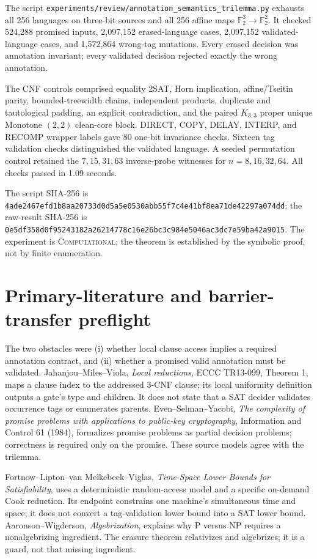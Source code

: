 \documentclass[11pt]{article}
\newcommand{\status}[1]{\textsc{#1}}
\begin{document}
The script
\texttt{experiments/review/annotation\_semantics\_trilemma.py} exhausts all
256 languages on three-bit sources and all 256 affine maps
$\mathbb F_2^3\to\mathbb F_2^2$.  It checked 524,288 promised inputs,
2,097,152 erased-language cases, 2,097,152 validated-language cases, and
1,572,864 wrong-tag mutations.  Every erased decision was annotation
invariant; every validated decision rejected exactly the wrong annotation.

The CNF controls comprised equality 2SAT, Horn implication, affine/Tseitin
parity, bounded-treewidth chains, independent products, duplicate and
tautological padding, an explicit contradiction, and the paired $K_{3,3}$
proper unique Monotone $(2,2)$ clean-core block.  DIRECT, COPY, DELAY, INTERP,
and RECOMP wrapper labels gave 80 one-bit invariance checks.  Sixteen tag
validation checks distinguished the validated language.  A seeded
permutation control retained the $7,15,31,63$ inverse-probe witnesses for
$n=8,16,32,64$.  All checks passed in 1.09 seconds.

The script SHA-256 is
\texttt{4ade2467efd1b8aa20733d0d5a5e0530abb55f7c4e41bf8ea71de42297a074dd};
the raw-result SHA-256 is
\texttt{0e5df358d0f95243182a26214778c16e26bc3c984e5046ac3dc7e59ba42a9015}.
The experiment is \status{Computational}; the theorem is established by the
symbolic proof, not by finite enumeration.

\section{Primary-literature and barrier-transfer preflight}

The two obstacles were (i) whether local clause access implies a required
annotation contract, and (ii) whether a promised valid annotation must be
validated.  Jahanjou--Miles--Viola, \emph{Local reductions}, ECCC TR13-099,
Theorem 1, maps a clause index to the addressed 3-CNF clause; its local
uniformity definition outputs a gate's type and children.  It does not state
that a SAT decider validates occurrence tags or enumerates parents.
Even--Selman--Yacobi, \emph{The complexity of promise problems with
applications to public-key cryptography}, Information and Control 61 (1984),
formalizes promise problems as partial decision problems; correctness is
required only on the promise.  These source models agree with the trilemma.

Fortnow--Lipton--van Melkebeek--Viglas, \emph{Time-Space Lower Bounds for
Satisfiability}, uses a deterministic random-access model and a specific
on-demand Cook reduction.  Its endpoint constrains one machine's simultaneous
time and space; it does not convert a tag-validation lower bound into a SAT
lower bound.  Aaronson--Wigderson, \emph{Algebrization}, explains why P versus
NP requires a nonalgebrizing ingredient.  The erasure theorem relativizes
and algebrizes; it is a guard, not that missing ingredient.
\end{document}
